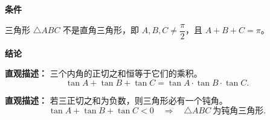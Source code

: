 \begin{statementbox}

\textbf{\textcolor{CStatement}{条件}}
\begin{description}[style=nextline, leftmargin=2.8em, labelsep=0.5em, itemsep=0.35em]
    \item[\textbf{\textcolor{CStatement}{条件 1（非直角三角形）：}}] 三角形 $\triangle ABC$ 不是直角三角形，即 $A,B,C \neq \dfrac{\pi}{2}$，且 $A+B+C=\pi$。
\end{description}

\textbf{\textcolor{CStatement}{结论}}
\begin{description}[style=nextline, leftmargin=2.8em, labelsep=0.5em, itemsep=0.45em]
    \item[\textbf{\textcolor{CStatement}{结论一（正切积和等式）：}}]
    \textbf{\textcolor{CStatement}{直观描述：}} 三个内角的正切之和恒等于它们的乘积。
    \[
    \tan A + \tan B + \tan C = \tan A \cdot \tan B \cdot \tan C.
    \]

    \item[\textbf{\textcolor{CStatement}{推广结论（负和钝角）：}}]
    \textbf{\textcolor{CStatement}{直观描述：}} 若三正切之和为负数，则三角形必有一个钝角。
    \[
    \tan A + \tan B + \tan C < 0 \quad\Longrightarrow\quad \triangle ABC\ \text{为钝角三角形}.
    \]
\end{description}

\end{statementbox}
